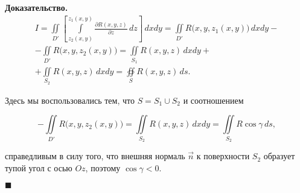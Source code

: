 \documentclass[12pt, a4paper]{article} %
\newcommand{\dd}[2]{\frac{\partial#1}{\partial#2}}
\newenvironment{Proof}{\par\textbf{Доказательство. }}
	{\hfill$\blacksquare$\vspace{0.1cm}}
\begin{document}
\begin{Proof}
    \begin{multline*}
        I = \iint\limits_{D'} \left[ 
            \int\limits_{z_2(x, y)}^{z_1(x, y)} \dd{R(x, y, z)}{z}\,dz
        \right]\,dxdy =
        \iint\limits_{D'} R\bigl(x, y, z_1(x, y)\bigr)\,dxdy - \\
        - \iint\limits_{D'} R\bigl(x, y, z_2(x, y)\bigr) =
        \iint\limits_{S_1} R(x, y, z)\,dxdy + \\
        + \iint\limits_{S_2} R(x, y, z)\,dxdy =
        \oiint\limits_S R(x, y, z)\,ds.
    \end{multline*} 
    
    \noindent
    Здесь мы воспользовались тем, что $S = S_1 \cup S_2$ и соотношением

    \begin{equation*}
        - \iint\limits_{D'} R\bigl(x, y, z_2(x, y)\bigr) =
        \iint\limits_{S_2} R(x, y, z)\,dxdy =
        \iint\limits_{S_2} R\cos\gamma \, ds,
    \end{equation*} 

    \noindent
    справедливым в силу того, что внешняя нормаль $\vec{n}$ к поверхности $S_2$
    образует тупой угол с осью $Oz$, поэтому  $\cos\gamma < 0$.

\end{Proof} 
    
\end{document}

